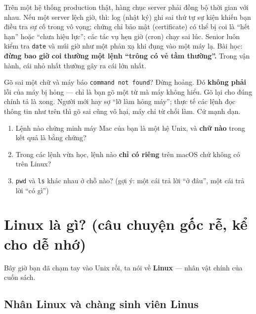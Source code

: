 \documentclass[12pt,a4paper]{article}
\begin{document}
\begin{seniorbox}
Trên một hệ thống production thật, hàng chục server phải đồng bộ thời gian với nhau. Nếu một server lệch giờ, thì: log (nhật ký) ghi sai thứ tự sự kiện khiến bạn điều tra sự cố trong vô vọng; chứng chỉ bảo mật (certificate) có thể bị coi là ``hết hạn'' hoặc ``chưa hiệu lực''; các tác vụ hẹn giờ (cron) chạy sai lúc. Senior luôn kiểm tra \texttt{date} và múi giờ như một phản xạ khi đụng vào một máy lạ. Bài học: \textbf{đừng bao giờ coi thường một lệnh ``trông có vẻ tầm thường''.} Trong vận hành, cái nhỏ nhất thường gây ra cái lớn nhất.
\end{seniorbox}

\begin{warnbox}
Gõ sai một chữ và máy báo \texttt{command not found}? Đừng hoảng. Đó \textbf{không phải} lỗi của máy bị hỏng — chỉ là bạn gõ một từ mà máy không hiểu. Gõ lại cho đúng chính tả là xong. Người mới hay sợ ``lỡ làm hỏng máy''; thực tế các lệnh đọc thông tin như trên thì gõ sai cũng vô hại, máy chỉ từ chối làm. Cứ mạnh dạn.
\end{warnbox}

\begin{quizbox}
\begin{enumerate}[leftmargin=*]
  \item Lệnh nào chứng minh máy Mac của bạn là một hệ Unix, và \textbf{chữ nào} trong kết quả là bằng chứng?
  \item Trong các lệnh vừa học, lệnh nào \textbf{chỉ có riêng} trên macOS chứ không có trên Linux?
  \item \texttt{pwd} và \texttt{ls} khác nhau ở chỗ nào? (gợi ý: một cái trả lời ``ở đâu'', một cái trả lời ``có gì'')
\end{enumerate}
\end{quizbox}

\section{Linux là gì? (câu chuyện gốc rễ, kể cho dễ nhớ)}

Bây giờ bạn đã chạm tay vào Unix rồi, ta nói về \textbf{Linux} — nhân vật chính của cuốn sách.

\subsection{Nhân Linux và chàng sinh viên Linus}
\end{document}
